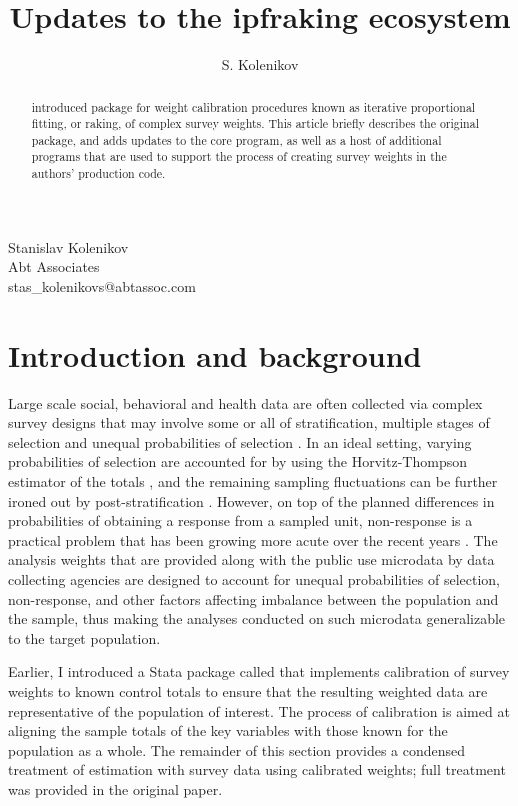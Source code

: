 \author{S. Kolenikov}{%
  Stanislav Kolenikov\\Abt Associates\\stas\_kolenikovs@abtassoc.com
}
\title[Raking survey data: updates]{Updates to the ipfraking ecosystem}
\maketitle

\begin{abstract}
\citet{kolenikov:2014} introduced package 
for weight calibration procedures known as iterative proportional fitting,
or raking, of complex survey weights.
This article briefly describes the original package,
and adds updates to the core program, as well as a host of
additional programs that are used to support the process of creating
survey weights in the authors' production code.

\end{abstract}

\section{Introduction and background}

Large scale social, behavioral and health data are often collected
via complex survey designs that may involve some or all of stratification,
multiple stages of selection and unequal probabilities of selection
\citep{korn:graubard:1995,korn:graubard:1999}.
In an ideal setting, varying probabilities of selection are
accounted for by using the Horvitz-Thompson estimator of the totals
\citep{horvitz:thompson:1952,thompson:1997}, and the remaining
sampling fluctuations can be further ironed out by
post-stratification \citep{holt:smith:1979}.
However, on top of the planned differences in probabilities of obtaining
a response from a sampled unit, non-response is a practical problem
that has been growing more acute over the recent years
\citep{groves:dillman:eltinge:little:2001,pew:2012}.
The analysis weights that are provided along with the public use
microdata by data collecting agencies are designed to account
for unequal probabilities of selection, non-response, and other factors
affecting imbalance between the population and the sample, thus making
the analyses conducted on such microdata generalizable to the target population.

Earlier, I introduced \citep{kolenikov:2014} a Stata package
called  that implements
calibration of survey weights to known control totals to ensure
that the resulting weighted data are representative of the population
of interest. The process of calibration is aimed at aligning the sample totals
of the key variables with those known for the population as a whole.
The remainder of this section provides a condensed treatment of estimation
with survey data using calibrated weights; full treatment was provided
in the original paper.


